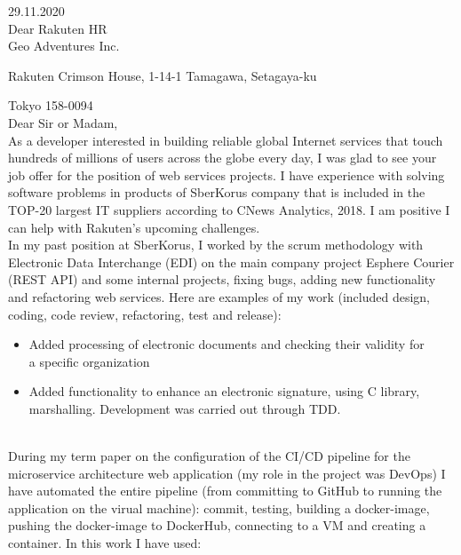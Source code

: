 \documentclass[
	a4paper,
]{fortysecondscv}
\begin{document}
\par
\makefrontsidebar{}

29.11.2020 \\

Dear Rakuten HR\\

Geo Adventures Inc.

Rakuten Crimson House, 1-14-1 Tamagawa, Setagaya-ku 

Tokyo 158-0094 \\

Dear Sir or Madam,\\

As a developer interested in building reliable global Internet services that touch hundreds of millions of users across the globe every day, I was glad to see your job offer for the position of web services projects. I have experience with solving software problems in products of SberKorus company that is included in the \colorbox{cvsidecolor}{TOP-20} largest IT suppliers according to CNews Analytics, 2018. I am positive I can help with Rakuten's upcoming challenges. \\

In my past position at SberKorus, I worked by the \colorbox{cvsidecolor}{scrum} methodology with \\ Electronic Data Interchange (\colorbox{cvsidecolor}{EDI}) on the main company project Esphere Courier (\colorbox{cvsidecolor}{REST API}) and some internal projects, fixing bugs, adding new functionality and refactoring \colorbox{cvsidecolor}{web services}. Here are examples of my work (included design, coding, code review, refactoring, test and release): 

\begin{itemize}
    \item Added processing of electronic documents and checking their validity for \\ a specific organization
    \item Added functionality to enhance an electronic signature, using C library, \\ marshalling. Development was carried out through \colorbox{cvsidecolor}{TDD}.
\end{itemize}

\\ During my term paper on the configuration of the \colorbox{cvsidecolor}{CI/CD} pipeline for the microservice architecture web application (my role in the project was DevOps) I have automated the entire pipeline (from committing to GitHub to running the application on the virual machine): commit, testing, building a docker-image, pushing the docker-image to DockerHub, connecting to a VM and creating a container. In this work I have used:
\end{document}
